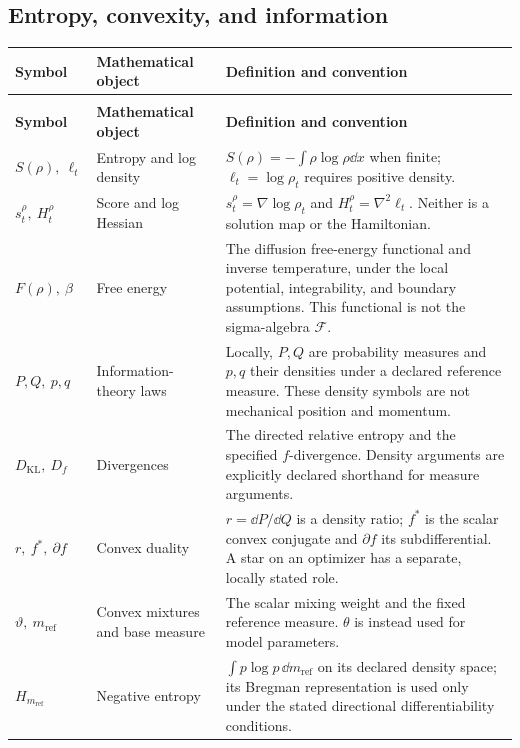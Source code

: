 \subsection*{Entropy, convexity, and information}
\begingroup
\small
{}
\setlength{\tabcolsep}{4pt}
\renewcommand{\arraystretch}{1.16}
\begin{longtable}{@{}>{\raggedright\arraybackslash}p{32mm}>{\raggedright\arraybackslash}p{26mm}>{\raggedright\arraybackslash}p{90mm}@{}}
\toprule
\textbf{Symbol} & \textbf{Mathematical object} & \textbf{Definition and convention}\\
\midrule
\endfirsthead
\multicolumn{3}{@{}l}{\small\itshape Entropy, convexity, and information (continued)}\\[3pt]
\toprule
\textbf{Symbol} & \textbf{Mathematical object} & \textbf{Definition and convention}\\
\midrule
\endhead
\bottomrule
\endfoot
$S(\rho),\ \ell_t$ & Entropy and log density & $S(\rho)=-\int\rho\log\rho\dd x$ when finite; $\ell_t=\log\rho_t$ requires positive density.\\[3pt]
$s_t^\rho,\ H_t^\rho$ & Score and log Hessian & $s_t^\rho=\nabla\log\rho_t$ and $H_t^\rho=\nabla^2\ell_t$. Neither is a solution map or the Hamiltonian.\\[3pt]
$F(\rho),\ \beta$ & Free energy & The diffusion free-energy functional and inverse temperature, under the local potential, integrability, and boundary assumptions. This functional is not the sigma-algebra $\mathcal F$.\\[3pt]
$P,Q,\ p,q$ & Information-theory laws & Locally, $P,Q$ are probability measures and $p,q$ their densities under a declared reference measure. These density symbols are not mechanical position and momentum.\\[3pt]
$D_{\mathrm{KL}},\ D_f$ & Divergences & The directed relative entropy and the specified $f$-divergence. Density arguments are explicitly declared shorthand for measure arguments.\\[3pt]
$r,\ f^*,\ \partial f$ & Convex duality & $r=\dd P/\dd Q$ is a density ratio; $f^*$ is the scalar convex conjugate and $\partial f$ its subdifferential. A star on an optimizer has a separate, locally stated role.\\[3pt]
$\vartheta,\ m_{\mathrm{ref}}$ & Convex mixtures and base measure & The scalar mixing weight and the fixed reference measure. $\theta$ is instead used for model parameters.\\[3pt]
$H_{m_{\mathrm{ref}}}$ & Negative entropy & $\int p\log p\,\dd m_{\mathrm{ref}}$ on its declared density space; its Bregman representation is used only under the stated directional differentiability conditions.\\[3pt]

\end{longtable}
